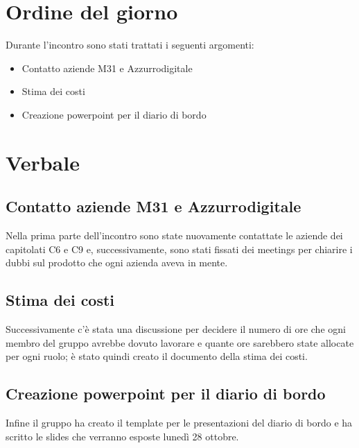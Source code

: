 \documentclass[italian, 12pt]{article}
\begin{document}
\section{Ordine del giorno}
Durante l'incontro sono stati trattati i seguenti argomenti: 
\begin{flushleft}
        \begin{itemize}
            \item Contatto aziende M31 e Azzurrodigitale
            \item Stima dei costi 
            \item Creazione powerpoint per il diario di bordo
        \end{itemize}
\end{flushleft}
\newpage

\section{Verbale}
\subsection{Contatto aziende M31 e Azzurrodigitale}
Nella prima parte dell'incontro sono state nuovamente contattate le aziende dei capitolati C6 e C9 e, successivamente, sono stati fissati dei meetings per chiarire i dubbi sul prodotto che ogni azienda aveva in mente.

\subsection{Stima dei costi}
Successivamente c'è stata una discussione per decidere il numero di ore che ogni membro del gruppo avrebbe dovuto lavorare e quante ore sarebbero state allocate per ogni ruolo; è stato quindi creato il documento della stima dei costi.

\subsection{Creazione powerpoint per il diario di bordo}
Infine il gruppo ha creato il template per le presentazioni del diario di bordo e ha scritto le slides che verranno esposte lunedì 28 ottobre.
\end{document}
